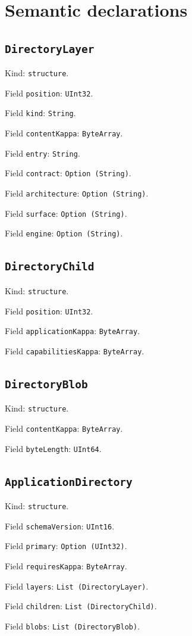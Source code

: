 \documentclass[11pt]{article}
\begin{document}
\section*{Semantic declarations}
\subsection*{\texttt{DirectoryLayer}}
\noindent Kind: \texttt{structure}.\par
\noindent Field \texttt{position}: \texttt{UInt32}.\par
\noindent Field \texttt{kind}: \texttt{String}.\par
\noindent Field \texttt{contentKappa}: \texttt{ByteArray}.\par
\noindent Field \texttt{entry}: \texttt{String}.\par
\noindent Field \texttt{contract}: \texttt{Option (String)}.\par
\noindent Field \texttt{architecture}: \texttt{Option (String)}.\par
\noindent Field \texttt{surface}: \texttt{Option (String)}.\par
\noindent Field \texttt{engine}: \texttt{Option (String)}.\par
\subsection*{\texttt{DirectoryChild}}
\noindent Kind: \texttt{structure}.\par
\noindent Field \texttt{position}: \texttt{UInt32}.\par
\noindent Field \texttt{applicationKappa}: \texttt{ByteArray}.\par
\noindent Field \texttt{capabilitiesKappa}: \texttt{ByteArray}.\par
\subsection*{\texttt{DirectoryBlob}}
\noindent Kind: \texttt{structure}.\par
\noindent Field \texttt{contentKappa}: \texttt{ByteArray}.\par
\noindent Field \texttt{byteLength}: \texttt{UInt64}.\par
\subsection*{\texttt{ApplicationDirectory}}
\noindent Kind: \texttt{structure}.\par
\noindent Field \texttt{schemaVersion}: \texttt{UInt16}.\par
\noindent Field \texttt{primary}: \texttt{Option (UInt32)}.\par
\noindent Field \texttt{requiresKappa}: \texttt{ByteArray}.\par
\noindent Field \texttt{layers}: \texttt{List (DirectoryLayer)}.\par
\noindent Field \texttt{children}: \texttt{List (DirectoryChild)}.\par
\noindent Field \texttt{blobs}: \texttt{List (DirectoryBlob)}.\par
\end{document}
